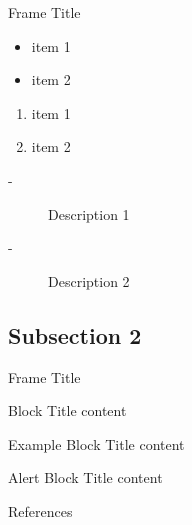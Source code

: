 \documentclass[svgnames, 12pt, aspectratio=43]{beamer}
\begin{document}
\begin{frame}{Frame Title}
\begin{itemize}
    \item item 1
    \item item 2
\end{itemize}

\vfill

\begin{enumerate}
    \item item 1
    \item item 2
\end{enumerate}


\vfill

\begin{description}
    \item[-] Description 1
    \item[-] Description 2
\end{description}



\end{frame}

\subsection{Subsection 2}

\begin{frame}{Frame Title}
\begin{block}{Block Title}
    content
\end{block}

\vfill

\begin{exampleblock}{Example Block Title}
    content
\end{exampleblock}

\vfill

\begin{alertblock}{Alert Block Title}
    content
\end{alertblock}
\end{frame}


\begin{frame}[allowframebreaks]{References}
    
    
\end{frame}
\end{document}
